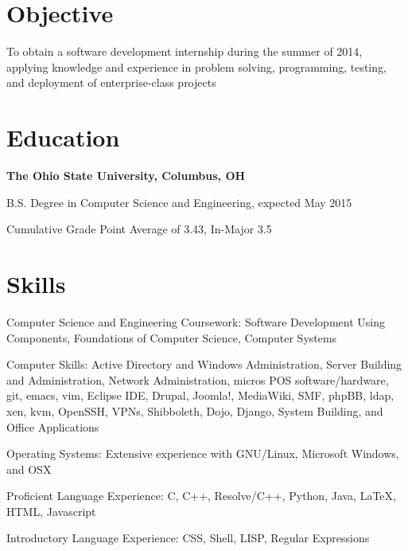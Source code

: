 \documentclass[letterpaper]{resume}
\begin{document}
\author{Christopher John Wallace}
\maketitle

\section{Objective}
\begin{compactitem}
	\item
		To obtain a software development internship during the summer of 2014, applying
		knowledge and experience in problem solving, programming, testing, and
		deployment of enterprise-class projects
\end{compactitem}

\section{Education}
\textbf{The Ohio State University, Columbus, OH}

\begin{compactitem}
	\item B.S. Degree in Computer Science and Engineering, expected May 2015
	\item Cumulative Grade Point Average of 3.43, In-Major 3.5
\end{compactitem}

\section{Skills}

\begin{compactitem}
	\item Computer Science and Engineering Coursework: Software Development Using Components, Foundations of Computer Science, Computer Systems

	\item Computer Skills: Active Directory and Windows Administration, Server Building and Administration, Network Administration, micros POS software/hardware, git, emacs, vim, Eclipse IDE, Drupal, Joomla!, MediaWiki, SMF, phpBB, ldap, xen, kvm, OpenSSH, VPNs, Shibboleth, Dojo, Django, System Building, and Office Applications

	\item Operating Systems: Extensive experience with GNU/Linux, Microsoft Windows, and OSX

	\item Proficient Language Experience: C, C++, Resolve/C++, Python, Java, \LaTeX, HTML, Javascript
	\item Introductory Language Experience: CSS, Shell, LISP, Regular Expressions

\end{compactitem}
\end{document}
